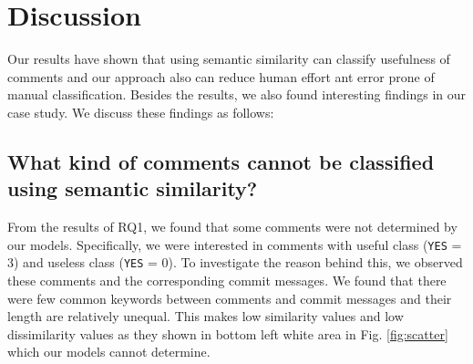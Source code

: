 \section{Discussion}
Our results have shown that using semantic similarity can classify usefulness of comments and our approach also can reduce human effort ant error prone of manual classification. Besides the results, we also found interesting findings in our case study. We discuss these findings as follows:


\subsection{What kind of comments cannot be classified using semantic similarity?}
From the results of RQ1, we found that some comments were not determined by our models. Specifically, we were interested in comments with useful class (\texttt{YES} = 3) and useless class (\texttt{YES} = 0). To investigate the reason behind this, we observed these comments and the corresponding commit messages. We found that there were few common keywords between comments and commit messages and their length are relatively unequal. This makes low similarity values and low dissimilarity values as they shown in  bottom left white area in Fig. \ref{fig:scatter} which our models cannot determine.




